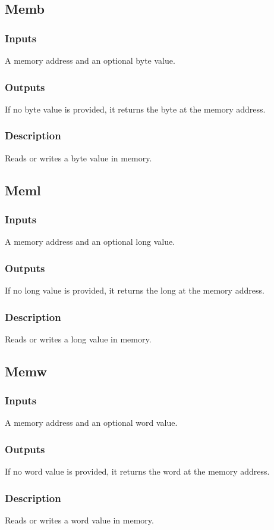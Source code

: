 \documentclass[10pt, openany]{book}
\begin{document}
\subsection{Memb}
\subsubsection{Inputs}
A memory address and an optional byte value.
\subsubsection{Outputs}
If no byte value is provided, it returns the byte at the memory address.
\subsubsection{Description}
Reads or writes a byte value in memory.

\subsection{Meml}
\subsubsection{Inputs}
A memory address and an optional long value.
\subsubsection{Outputs}
If no long value is provided, it returns the long at the memory address.
\subsubsection{Description}
Reads or writes a long value in memory.

\subsection{Memw}
\subsubsection{Inputs}
A memory address and an optional word value.
\subsubsection{Outputs}
If no word value is provided, it returns the word at the memory address.
\subsubsection{Description}
Reads or writes a word value in memory.
\end{document}

